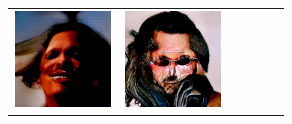 \documentclass{article}
\newcommand{\pganw}{1.0in}
\begin{document}
\begin{table}[htbp]
\begin{center}
\begin{tabular}{cc|cc|cc}
\includegraphics[width=\pganw]{figures/pgan/4_base_raw_base.png} &
\includegraphics[width=\pganw]{figures/pgan/5_base_raw_base.png} &

\end{tabular}
\end{center}
\end{table}
\end{document}
